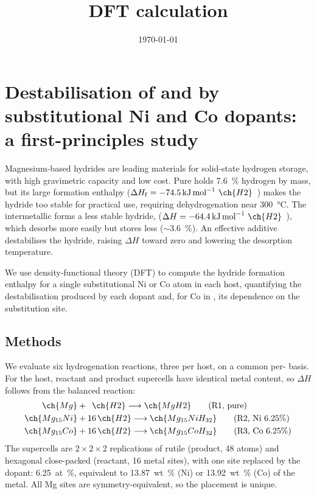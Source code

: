 \documentclass[11pt,a4paper]{article}
\title{DFT calculation}
\date{\today}
\begin{document}
\maketitle

\section{Destabilisation of  and  by substitutional
         Ni and Co dopants: a first-principles study}
\label{sec:nicodop}

Magnesium-based hydrides are leading materials for solid-state hydrogen
storage, with high gravimetric capacity and low cost. Pure  holds
\SI{7.6}{\percent} hydrogen by mass, but its large formation enthalpy
($\Delta H_\mathrm{f} = \SI{-74.5}{\kilo\joule\per\mol}~\ch{H2}$~\cite{bogdanovic1999,stampfer1960})
makes the hydride too stable for practical use, requiring dehydrogenation
near \SI{300}{\celsius}. The intermetallic  forms a less stable
hydride,  ($\Delta H = \SI{-64.4}{\kilo\joule\per\mol}~\ch{H2}$~\cite{reilly1968}),
which desorbs more easily but stores less ($\sim$\SI{3.6}{\percent}). An effective additive
destabilises the hydride, raising $\Delta H$ toward zero and lowering the
desorption temperature.

We use density-functional theory (DFT) to compute the hydride formation
enthalpy for a single substitutional Ni or Co atom in each host, quantifying
the destabilisation produced by each dopant and, for Co in , its
dependence on the substitution site.

\subsection{Methods}
\label{sec:nicodop:methods}

We evaluate six hydrogenation reactions, three per host, on a common
per- basis. For the  host, reactant and product supercells have
identical metal content, so $\Delta H$ follows from the balanced reaction:
\begin{align}
\ch{Mg}        &+ \phantom{1}\ch{H2} \longrightarrow \ch{MgH2}        \tag{R1, pure}\\
\ch{Mg_{15}Ni} &+ 16\,\ch{H2}        \longrightarrow \ch{Mg_{15}NiH_{32}} \tag{R2, Ni 6.25\%}\\
\ch{Mg_{15}Co} &+ 16\,\ch{H2}        \longrightarrow \ch{Mg_{15}CoH_{32}} \tag{R3, Co 6.25\%}
\end{align}
The supercells are $2\!\times\!2\!\times\!2$ replications of rutile 
(product, 48 atoms) and hexagonal close-packed  (reactant, 16 metal
sites), with one site replaced by the dopant: \SI{6.25}{at.\percent},
equivalent to \SI{13.87}{wt.\percent} (Ni) or \SI{13.92}{wt.\percent} (Co) of
the metal. All Mg sites are symmetry-equivalent, so the placement is unique.
\end{document}
